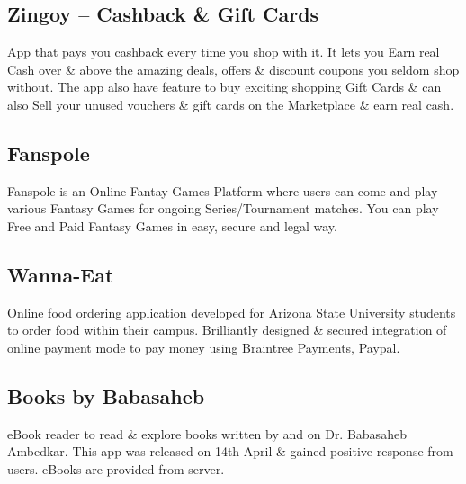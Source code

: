 \documentclass[]{deedy-resume-openfont}
\begin{document}
\begin{minipage}[t]{0.66\textwidth}
\sectionsep

\subsection{Zingoy – Cashback \& Gift Cards}
App that pays you cashback every time you shop with it. It lets you Earn real Cash over \& above the amazing deals, offers \& discount coupons you seldom shop without. The app also have feature to buy exciting shopping Gift Cards \& can also Sell your unused vouchers \& gift cards on the Marketplace \& earn real cash.
\sectionsep

\subsection{Fanspole}
Fanspole is an Online Fantay Games Platform where users can come and play various Fantasy Games for ongoing Series/Tournament matches. You can play Free and Paid Fantasy Games in easy, secure and legal way.
\sectionsep

\subsection{Wanna-Eat}
Online food ordering application developed for Arizona State University students to order food within their campus. Brilliantly designed \& secured integration of online payment mode to pay money using Braintree Payments, Paypal.
\sectionsep

\subsection{Books by Babasaheb}
eBook reader to read \& explore books written by and on Dr. Babasaheb Ambedkar. This app was released on 14th April \& gained positive response from users. eBooks are provided from server.
\sectionsep


\end{minipage}
\end{document}
